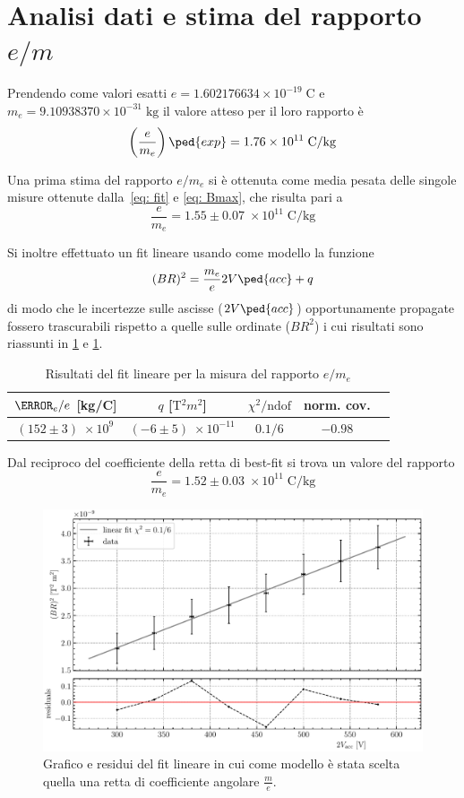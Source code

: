 \documentclass[10pt, a4paper, italian]{article}
\begin{document}
\section{Analisi dati e stima del rapporto $e/m$}
Prendendo come valori esatti $e = 1.602176634 \times 10^{-19} \; \si{\coulomb}$
e $m_{e} = 9.10938370 \times 10^{-31} \; \si{\kilogram}$ il valore atteso per
il loro rapporto è
\begin{equation}\label{eq: e-m-exp}
\left(\frac{e}{m_e}\right)\ped{exp} =
1.76 \times 10^{11}\; \si{\coulomb/\kilogram}
\end{equation}

Una prima stima del rapporto $e/m_e$ si è ottenuta come media pesata delle
singole misure ottenute dalla~\cref{eq: fit} e \cref{eq: Bmax}, che risulta
pari a
\[
\frac{e}{m_e} = 1.55 \pm 0.07 \; \times 10^{11} \; \si{\coulomb/\kilogram}
\]

Si inoltre effettuato un fit lineare usando come modello la funzione
\[
(BR)^2 = \frac{m_e}{e} 2 V\ped{acc} + q
\]
di modo che le incertezze sulle ascisse ($2 V\ped{acc}$) opportunamente
propagate fossero trascurabili rispetto a quelle sulle ordinate (${BR}^2$)
i cui risultati sono riassunti in \cref{tab: linfit} e \cref{fig: linfit}.
\begin{table}
\centering
\begin{tabular}{ccccc}
\toprule
$\m_e/e$ [kg/C] & $q$ [$\si{\tesla^2 m^2}$] & $\chi^2/\text{ndof}$ & norm. cov. \\
\midrule
$(152 \pm 3) \; \times 10^{9}$ & $(-6 \pm 5) \; \times 10^{-11}$ &
$0.1/6$ & $-0.98$ \\
\bottomrule
\end{tabular}
\caption{Risultati del fit lineare per la misura del rapporto $e/m_e$
\label{tab: linfit}}
\end{table}

Dal reciproco del coefficiente della retta di best-fit si trova un valore del
rapporto
\[
\frac{e}{m_e} = 1.52 \pm 0.03 \; \times 10^{11} \; \si{\coulomb/\kilogram}
\]

\begin{figure}
\includegraphics[width=\textwidth]{lin}
\caption{Grafico e residui del fit lineare in cui come modello è stata scelta
quella una retta di coefficiente angolare $\frac{m}{e}$.
\label{fig: linfit}}
\end{figure}
\end{document}
